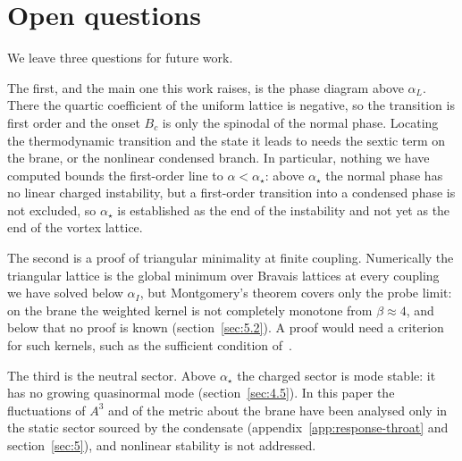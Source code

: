\section{Open questions}
\label{sec:6}

We leave three questions for future work.

The first, and the main one this work raises, is the phase diagram above
$\alpha_L$. There the quartic
coefficient of the uniform lattice is negative, so the transition is first
order and the onset $B_c$ is only the spinodal of the normal phase. Locating
the thermodynamic transition and the state it leads to needs the sextic
term on the brane, or the nonlinear condensed branch. In particular,
nothing we have computed bounds the first-order line to $\alpha < \alpha_\star$:
above $\alpha_\star$ the normal phase has no linear charged instability, but
a first-order transition into a condensed phase is not excluded, so
$\alpha_\star$ is established as the end of the instability and not yet as
the end of the vortex lattice.

The second is a proof of triangular minimality at finite coupling.
Numerically the triangular lattice is the global minimum over Bravais
lattices at every coupling we have solved below $\alpha_I$, but
Montgomery's theorem covers only the probe limit: on the brane the weighted
kernel is not completely monotone from $\beta \approx 4$, and below that no
proof is known (section~\ref{sec:5.2}). A proof would need a criterion for such kernels, such as
the sufficient condition of~\cite[theorem~1.1]{Betermin:2016theta}.

The third is the neutral sector. Above $\alpha_\star$ the charged sector
is mode stable: it has no growing quasinormal mode
(section~\ref{sec:4.5}). In this paper the fluctuations of $A^3$ and of
the metric about the brane have been analysed only in the static sector
sourced by the condensate (appendix~\ref{app:response-throat} and section~\ref{sec:5}), and
nonlinear stability is not addressed.

